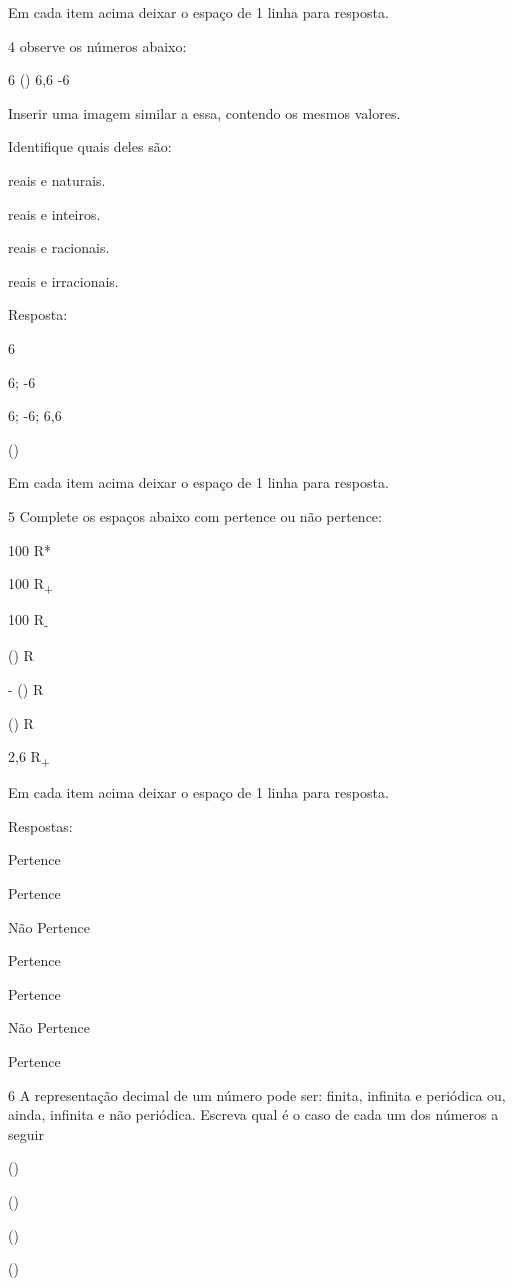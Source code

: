 Em cada item acima deixar o espaço de 1 linha para resposta.

\num{4} observe os números abaixo:

6 () 6,6 -6

Inserir uma imagem similar a essa, contendo os mesmos valores.

Identifique quais deles são:

\item reais e naturais.
\item reais e inteiros.
\item reais e racionais.
\item reais e irracionais.

Resposta:

\item 6
\item 6; -6
\item 6; -6; 6,6
\item ()

Em cada item acima deixar o espaço de 1 linha para resposta.

\num{5} Complete os espaços abaixo com pertence ou não pertence:

\item 100 R*
\item 100 R\textsubscript{+}
\item 100 R\textsubscript{-}
\item () R
\item - () R
\item () R
\item 2,6 R\textsubscript{+}

Em cada item acima deixar o espaço de 1 linha para resposta.

Respostas:

\item Pertence
\item Pertence
\item Não Pertence
\item Pertence
\item Pertence
\item Não Pertence
\item Pertence

\num{6} A representação decimal de um número pode ser: finita, infinita e
periódica ou, ainda, infinita e não periódica. Escreva qual é o caso de
cada um dos números a seguir

\item ()
\item ()
\item ()
\item ()

